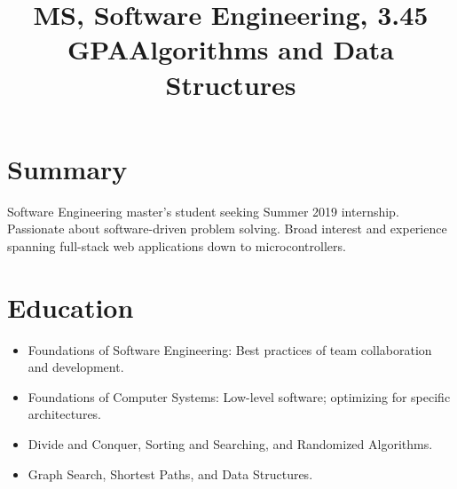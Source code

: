 \documentclass[12pt]{res} %
\begin{document}
    \begin{resume}
 
      \section{Summary}
      Software Engineering master's student seeking Summer 2019 internship.
      Passionate about software-driven problem solving.
      Broad interest and experience spanning full-stack web applications down to microcontrollers.
      \vspace{-24pt}

      \section{Education}

          \title{\textbf{MS, Software Engineering, 3.45 GPA}}
          \begin{position}
              \vspace{-14pt}
              \begin{itemize}[leftmargin=-0.4cm]
              \itemsep0em
              \item Foundations of Software Engineering: Best practices of team collaboration and development.
              \item Foundations of Computer Systems: Low-level software; optimizing for specific architectures.
              \end{itemize}
          \end{position}
          \vspace{-12pt}

          \title{\textbf{Algorithms and Data Structures}}
          \begin{position}
              \vspace{-14pt}
              \begin{itemize}[leftmargin=-0.4cm]
              \itemsep0em
              \item Divide and Conquer, Sorting and Searching, and Randomized Algorithms.
              \item Graph Search, Shortest Paths, and Data Structures.
              \end{itemize}
          \end{position}
          \vspace{-12pt}


\end{resume}
\end{document}
